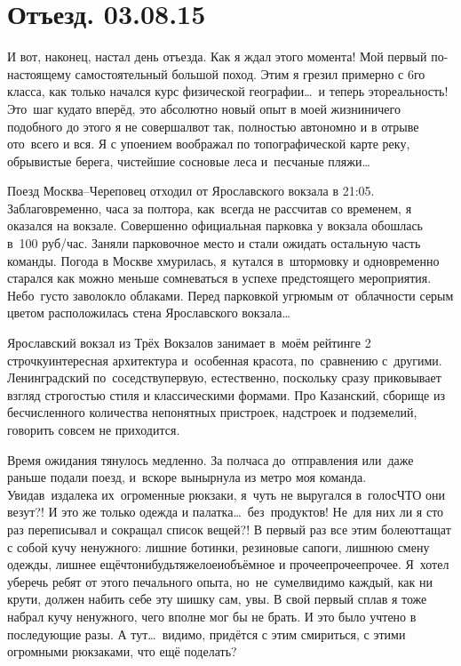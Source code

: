 \chapter{Отъезд. 03.08.15}

И вот, наконец, настал день отъезда. Как я ждал этого момента! Мой первый по-настоящему самостоятельный большой поход. Этим я грезил примерно с 6\sdash го класса, как только начался курс физической географии\ldots~и теперь это\mdash реальность! Это~шаг куда\sdash то вперёд, это абсолютно новый опыт в моей жизни\mdash ничего подобного до этого я не совершал\mdash вот так, полностью автономно и в отрыве ото~всего и вся. Я с упоением воображал по топографической карте реку, обрывистые берега, чистейшие сосновые леса и~песчаные пляжи\ldots 

Поезд Москва\nobreakdash--Череповец отходил от Ярославского вокзала в 21:05. Заблаговременно, часа за полтора, как~всегда не рассчитав со временем, я оказался на вокзале. Совершенно официальная парковка у вокзала обошлась в~100 руб/час. Заняли парковочное место и стали ожидать остальную часть команды. Погода в Москве хмурилась, я~кутался в~штормовку и одновременно старался как можно меньше сомневаться в успехе предстоящего мероприятия. Небо~густо заволокло облаками. Перед парковкой угрюмым от~облачности серым цветом расположилась стена Ярославского вокзала\ldots

Ярославский вокзал из Трёх Вокзалов занимает в~моём рейтинге 2 строчку\mdash интересная архитектура и~особенная красота, по~сравнению с~другими. Ленинградский по~соседству\mdash первую, естественно, поскольку сразу приковывает взгляд строгостью стиля и классическими формами. Про Казанский, сборище из бесчисленного количества непонятных пристроек, надстроек и подземелий, говорить совсем не приходится.

Время ожидания тянулось медленно. За полчаса до~отправления или~даже раньше подали поезд, и~вскоре вынырнула из метро моя команда. Увидав~издалека их~огроменные рюкзаки, я~чуть не выругался в~голос\mdash ЧТО они везут?! И это же только одежда и палатка\ldots ~без~продуктов! Не~для них ли я сто раз переписывал и сокращал список вещей?! В первый раз все этим болеют\mdash тащат с собой кучу ненужного: лишние ботинки, резиновые сапоги, лишнюю смену одежды, лишнее ещё\sdash что\sdash нибудь\sdash тяжелое\sdash и\sdash объёмное и прочее\sdash прочее\sdash прочее. Я~хотел уберечь ребят от этого печального опыта, но~не~сумел\mdash видимо каждый, как ни крути, должен набить себе эту шишку сам, увы. В свой первый сплав я тоже набрал кучу ненужного, чего вполне мог бы не брать. И это было учтено в последующие разы. А тут\ldots~видимо, придётся с этим смириться, с этими огромными рюкзаками, что ещё поделать?


